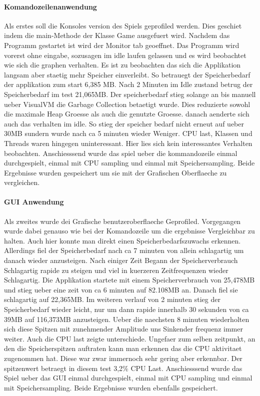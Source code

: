\documentclass{article}
\begin{document}
\paragraph{Komandozeilenanwendung}
Als erstes soll die Konsoles version des Spiels geprofiled werden. Dies geschiet indem die main-Methode der Klasse Game ausgefuert wird. Nachdem das Programm gestartet ist wird der Monitor tab geoeffnet. Das Programm wird vorerst ohne eingabe, sozusagen im idle laufen gelassen und es wird beobachtet wie sich die graphen verhalten. Es ist zu beobachten das sich die Applikation langsam aber staetig mehr Speicher einverleibt. So betrauegt der Speicherbedarf der applikation zum start 6,385 MB. Nach 2 Minuten im Idle zustand betrug der Speicherbedarf im test 21,065MB. Der speicherbedarf stieg solange an bis manuell ueber VisualVM die Garbage Collection betaetigt wurde. Dies reduzierte sowohl die maximale Heap Groesse als auch die genutzte Groesse. danach aenderte sich auch das verhalten im idle. So stieg der speicher bedarf nicht erneut auf ueber 30MB sundern wurde nach ca 5 minuten wieder Weniger. CPU last, Klassen und Threads waren hingegen uninteressant. Hier lies sich kein interessantes Verhalten beobachten.
Anschiesssend wurde das spiel ueber die kommandozeile einmal durchgespielt, einmal mit CPU sampling und einmal mit Speichersampling. Beide Ergebnisse wurden gespeichert um sie mit der Grafischen Oberflaeche zu vergleichen.

\paragraph{GUI Anwendung}
Als zweites wurde dei Grafische benutzeroberflaeche Geprofiled. Vorgegangen wurde dabei genauso wie bei der Komandozeile um die ergebnisse Vergleichbar zu halten. Auch hier konnte man direkt einen Speicherbedarfszuwachs erkennen. Allerdings fiel der Speicherbedarf nach ca 7 minuten von allein schlagartig um danach wieder anzusteigen. Nach einiger Zeit Begann der Speicherverbrauch Schlagartig rapide zu steigen und viel in kuerzeren Zeitfrequenzen wieder Schlagartig. Die Applikation startete mit einem Speicherverbrauch von 25,478MB und stieg ueber eine zeit von ca 6 minuten auf  82.108MB an. Danach fiel sie schlagartig auf 22,365MB. Im weiteren verlauf von 2 minuten stieg der Speicherbedarf wieder leicht, nur um dann rapide innerhalb 30 sekunden von ca 39MB auf 116,373MB anzusteigen. Ueber die naechsten 8 minuten wiederholten sich diese Spitzen mit zunehmender Amplitude uns Sinkender frequenz immer weiter. Auch die CPU last zeigte unterschiede. Ungefaer zum selben zeitpunkt, an den die Speicherspitzen auftraten kann man erkennen das die CPU aktivitaet zugenommen hat. Diese war zwar immernoch sehr gering aber erkennbar. Der spitzenwert betraegt in diesem test 3,2\% CPU Last. Anschiesssend wurde das Spiel ueber das GUI einmal durchgespielt, einmal mit CPU sampling und einmal mit Speichersampling. Beide Ergebnisse wurden ebenfalls gespeichert.
\end{document}
